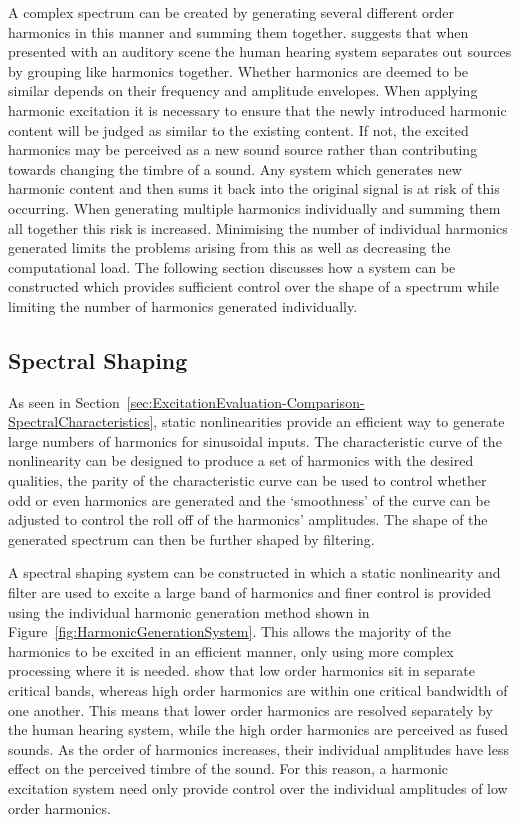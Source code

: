 		A complex spectrum can be created by generating several different order harmonics in this manner and
		summing them together. \citet{bregman1994auditory} suggests that when presented with an auditory scene the
		human hearing system separates out sources by grouping like harmonics together. Whether harmonics are
		deemed to be similar depends on their frequency and amplitude envelopes. When applying harmonic excitation
		it is necessary to ensure that the newly introduced harmonic content will be judged as similar to the
		existing content. If not, the excited harmonics may be perceived as a new sound source rather than
		contributing towards changing the timbre of a sound. Any system which generates new harmonic content and
		then sums it back into the original signal is at risk of this occurring. When generating multiple harmonics
		individually and summing them all together this risk is increased. Minimising the number of individual
		harmonics generated limits the problems arising from this as well as decreasing the computational load. The
		following section discusses how a system can be constructed which provides sufficient control over the
		shape of a spectrum while limiting the number of harmonics generated individually.
		
	\subsection{Spectral Shaping}
	\label{sec:FeatureControl-Systems-SpectralShaping}
		As seen in Section~\ref{sec:ExcitationEvaluation-Comparison-SpectralCharacteristics}, static nonlinearities
		provide an efficient way to generate large numbers of harmonics for sinusoidal inputs. The characteristic
		curve of the nonlinearity can be designed to produce a set of harmonics with the desired qualities, the
		parity of the characteristic curve can be used to control whether odd or even harmonics are generated and
		the `smoothness' of the curve can be adjusted to control the roll off of the harmonics' amplitudes. The
		shape of the generated spectrum can then be further shaped by filtering.

		A spectral shaping system can be constructed in which a static nonlinearity and filter are used to excite a
		large band of harmonics and finer control is provided using the individual harmonic generation method shown
		in Figure~\ref{fig:HarmonicGenerationSystem}. This allows the majority of the harmonics to be excited in an
		efficient manner, only using more complex processing where it is needed. \citet{howard2009acoustics} show
		that low order harmonics sit in separate critical bands, whereas high order harmonics are within one
		critical bandwidth of one another. This means that lower order harmonics are resolved separately by the
		human hearing system, while the high order harmonics are perceived as fused sounds. As the order of
		harmonics increases, their individual amplitudes have less effect on the perceived timbre of the sound. For
		this reason, a harmonic excitation system need only provide control over the individual amplitudes of low
		order harmonics. 

